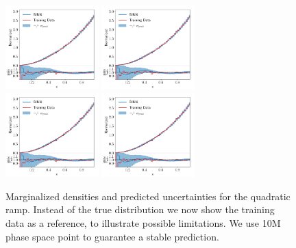 \begin{figure}[t]
\centering
\includegraphics[width=0.32\textwidth,page=3]{./figures/bINN/quadratic_1dhists_with_unc}
\hspace*{0.1\textwidth}
\includegraphics[width=0.32\textwidth,page=4]{./figures/bINN/quadratic_1dhists_with_unc}\\
\includegraphics[width=0.32\textwidth,page=1]{./figures/bINN/quadratic_1dhists_with_unc}
\hspace*{0.1\textwidth}
\includegraphics[width=0.32\textwidth,page=2]{./figures/bINN/quadratic_1dhists_with_unc}
\caption{Marginalized densities and predicted uncertainties for the
  quadratic ramp. Instead of the true distribution we now show the training data as a reference, to illustrate possible limitations. We use 10M phase space point to guarantee a stable prediction.}
\label{fig:marginalized}
\end{figure}

